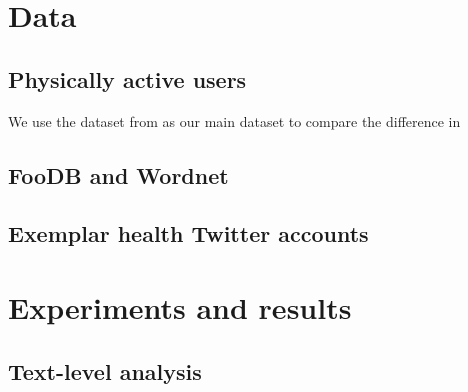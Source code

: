 \documentclass[letterpaper]{article}
\newcommand{\cut}[1]{}
\begin{document}
\section{Data}

\subsection{Physically active users}

\cut {
  - landeiro2015using data
  - explain how it has been built: hashtag of tracking apps gives us the physically active users. matching on social media features, gender, and location gives us the control group.
}

We use the dataset from \cite{landeiro2015using} as our main dataset to compare the difference in  

\subsection{FooDB and Wordnet}

\subsection{Exemplar health Twitter accounts}

\section{Experiments and results}

\subsection{Text-level analysis}

\cut {
  - most predictive features
  -
}





\end{document}
